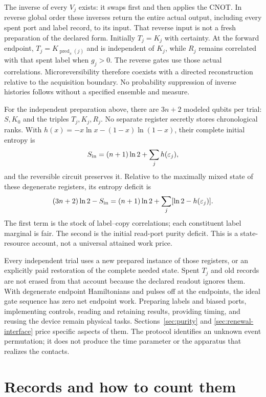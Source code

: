 \documentclass[12pt,a4paper]{article}
\begin{document}
The inverse of every $V_j$ exists: it swaps first and then applies the
CNOT. In reverse global order these inverses return the entire actual
output, including every spent port and label record, to its input.
That reverse input is not a fresh preparation of the declared form.
Initially $T_j=K_j$ with certainty. At the forward endpoint,
$T_j=K_{\operatorname{pred}_\pi(j)}$ and is independent of $K_j$,
while $R_j$ remains correlated with that spent label when $g_j>0$.
The reverse gates use those actual correlations.
Microreversibility therefore coexists with a directed reconstruction
relative to the acquisition boundary. No probability suppression of
inverse histories follows without a specified ensemble and measure.

For the independent preparation above, there are $3n+2$ modeled qubits per trial: $S,K_0$ and the triples
$T_j,K_j,R_j$. No separate register secretly stores chronological
ranks. With $h(x)=-x\ln x-(1-x)\ln(1-x)$, their complete initial entropy is
\[
 S_{\rm in}=(n+1)\ln2+\sum_jh(\varepsilon_j),
\]
and the reversible circuit preserves it. Relative to the maximally
mixed state of these degenerate registers, its entropy deficit is
\begin{equation}
 (3n+2)\ln2-S_{\rm in}
 =(n+1)\ln2+\sum_j[\ln2-h(\varepsilon_j)] .
 \label{eq:order-boundary-resource}
\end{equation}
The first term is the stock of label--copy correlations; each
constituent label marginal is fair. The second is the initial
read-port purity deficit. This is a state-resource account, not a
universal attained work price.

Every independent trial uses a new prepared instance of those
registers, or an explicitly paid restoration of the complete needed
state. Spent $T_j$ and old records are not erased from that account
because the declared readout ignores them.
With degenerate endpoint Hamiltonians and pulses off at the endpoints,
the ideal gate sequence has zero net endpoint work.
Preparing labels and biased ports, implementing controls, reading and
retaining results, providing timing, and reusing the device remain
physical tasks. Sections~\ref{sec:purity} and
\ref{sec:renewal-interface} price specific aspects of them.
The protocol identifies an unknown event permutation; it does not
produce the time parameter or the apparatus that realizes the contacts.

\section{Records and how to count them}
\label{sec:records}
\end{document}
